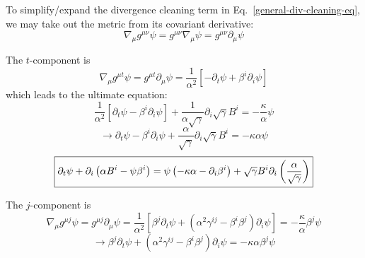 \documentclass[11pt,preprint]{aastex}
\newcommand{\beq}[1]{\begin{equation} #1 \end{equation}}
\newcommand{\beqa}[1]{\begin{eqnarray} #1 \end{eqnarray}}
\begin{document}

To simplify/expand the divergence cleaning term in Eq.~\ref{general-div-cleaning-eq}, we may take out the metric from its covariant derivative:
\beq{
\nabla_\mu g^{\mu \nu} \psi = g^{\mu \nu} \nabla_\mu \psi = g^{\mu \nu} \partial_\mu \psi 
}

The $t$-component is 
\beq{
\nabla_\mu g^{\mu t} \psi = g^{\mu t} \partial_\mu \psi = \frac{1}{\alpha^2} \left[ -\partial_t \psi + \beta^i \partial_i \psi \right]
}
which leads to the ultimate equation:
\beq{
\frac{1}{\alpha^2} \left[ \partial_t \psi - \beta^i \partial_i \psi \right] + \frac{1}{\alpha \sqrt{\gamma}} \partial_i \sqrt{\gamma} B^i = -\frac{\kappa}{\alpha} \psi  
}
\beq{
\rightarrow \partial_t \psi - \beta^i \partial_i \psi  + \frac{\alpha}{\sqrt{\gamma}} \partial_i \sqrt{\gamma} B^i = -\kappa \alpha \psi  
}
\beq{
\fbox{$ \displaystyle
\partial_t \psi + \partial_i \left( \alpha B^i - \psi \beta^i \right)  
=  \psi \left( -\kappa \alpha - \partial_i \beta^i  \right)
+ \sqrt{\gamma} B^i \partial_i \left( \frac{\alpha}{\sqrt{\gamma}} \right)\label{dphi-dt-eq}
$}
}

The $j$-component is 
\beq{
\nabla_\mu g^{\mu j} \psi =  g^{\mu j} \partial_\mu \psi 
= \frac{1}{\alpha^2} \left[ \beta^j \partial_t \psi + \left(\alpha^2 \gamma^{i j} - \beta^i \beta^j \right) \partial_i \psi \right]
=  -\frac{\kappa}{\alpha} \beta^j \psi   
}
\beq{
\rightarrow  \beta^j \partial_t \psi + \left(\alpha^2 \gamma^{i j} - \beta^i \beta^j \right) \partial_i \psi
=  -\kappa \alpha  \beta^j \psi  
}
\end{document}
